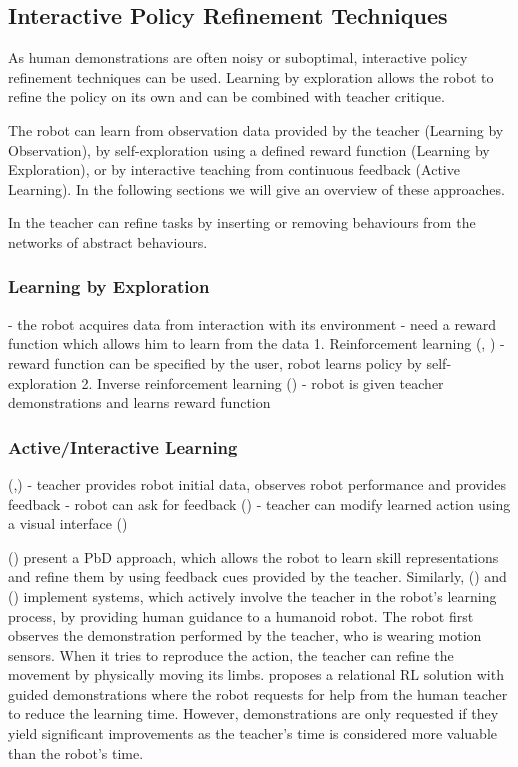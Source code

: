 \subsection{Interactive Policy Refinement Techniques}\label{subsec:Other RP Methods}
As human demonstrations are often noisy or suboptimal, interactive policy refinement techniques can be used.
Learning by exploration allows the robot to refine the policy on its own and can be combined with  teacher critique. 

The robot can learn from observation data provided by the teacher (Learning by Observation), by self-exploration using a defined reward function (Learning by Exploration), or by interactive teaching from continuous feedback (Active Learning). In the following sections we will give an overview of these approaches.

In \cite{nicolescu2003natural} the teacher can refine tasks by inserting or removing behaviours from the networks of abstract behaviours.

\subsubsection{Learning by Exploration}\label{sssec:LbExploration}

- the robot acquires data from interaction with its environment
- need a reward function which allows him to learn from the data
1. Reinforcement learning (\cite{sutton1998reinforcement}, \cite{mnih2015human})
 - reward function can be specified by the user, robot learns policy by self-exploration
 2. Inverse reinforcement learning (\cite{abbeel2004apprenticeship})
 - robot is given teacher demonstrations and learns reward function

\subsubsection{Active/Interactive Learning}\label{sssec:Active Learning} (\cite{chernova2014robot},\cite{calinon2007active})
 - teacher provides robot initial data, observes robot performance and provides feedback
     - robot can ask for feedback (\cite{cakmak2012aaai})
 - teacher can modify learned action using a visual interface (\cite{alexandrova2015roboflow})

 (\cite{nicolescu2003natural}) present a PbD approach, which allows the robot to learn skill representations and refine them by using feedback cues provided by the teacher.
Similarly, (\cite{calinon2007active}) and (\cite{calinon2007incremental}) implement systems, which actively involve the teacher in the robot's learning process, by providing human guidance to a humanoid robot. The robot first observes the demonstration performed by the teacher, who is wearing motion sensors. When it tries to reproduce the action, the teacher can refine the movement by physically moving its limbs.
\cite{martinez2017relational} proposes a relational RL solution with guided demonstrations where the robot requests for help from the human teacher to reduce the learning time.
However, demonstrations are only requested if they yield significant improvements as the teacher's time is considered more valuable than the robot's time.

